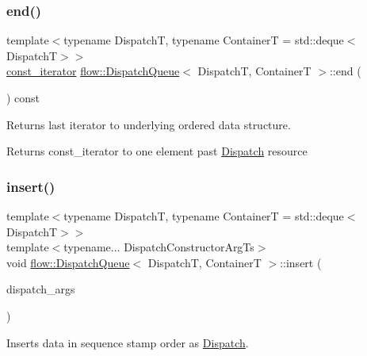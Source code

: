 \subsubsection{\texorpdfstring{end()}{end()}}
{\footnotesize\ttfamily template$<$typename DispatchT, typename ContainerT = std\+::deque$<$\+Dispatch\+T$>$$>$ \\
\hyperlink{classflow_1_1_dispatch_queue_a307496fdc34a2d59e11114dabf85dc8a}{const\+\_\+iterator} \hyperlink{classflow_1_1_dispatch_queue}{flow\+::\+Dispatch\+Queue}$<$ DispatchT, ContainerT $>$\+::end (\begin{DoxyParamCaption}{ }\end{DoxyParamCaption}) const\hspace{0.3cm}{\ttfamily [inline]}}



Returns last iterator to underlying ordered data structure. 

\begin{DoxyReturn}{Returns}
{\ttfamily const\+\_\+iterator} to one element past \hyperlink{classflow_1_1_dispatch}{Dispatch} resource 
\end{DoxyReturn}
\mbox{\label{classflow_1_1_dispatch_queue_a5221c73d3790e6795c48229a2bcd7c0e}} 
\subsubsection{\texorpdfstring{insert()}{insert()}}
{\footnotesize\ttfamily template$<$typename DispatchT, typename ContainerT = std\+::deque$<$\+Dispatch\+T$>$$>$ \\
template$<$typename... Dispatch\+Constructor\+Arg\+Ts$>$ \\
void \hyperlink{classflow_1_1_dispatch_queue}{flow\+::\+Dispatch\+Queue}$<$ DispatchT, ContainerT $>$\+::insert (\begin{DoxyParamCaption}\item[{Dispatch\+Constructor\+Arg\+Ts \&\&...}]{dispatch\+\_\+args }\end{DoxyParamCaption})\hspace{0.3cm}{\ttfamily [inline]}}



Inserts data in sequence stamp order as \hyperlink{classflow_1_1_dispatch}{Dispatch}. 



